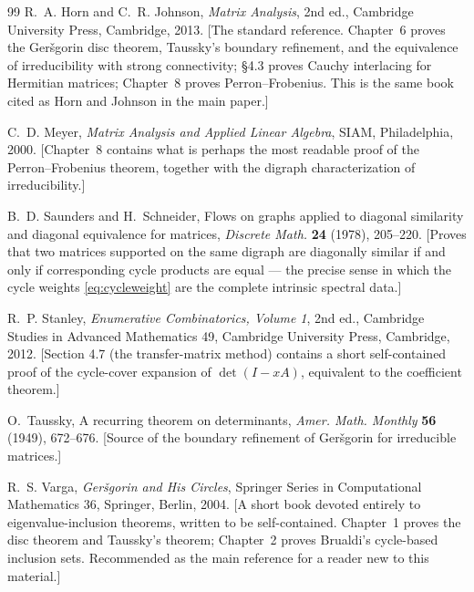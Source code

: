 \documentclass[11pt, fleqn]{amsart}
\theoremstyle{remark}
\begin{document}
\begin{thebibliography}{99}
R.~A. Horn and C.~R. Johnson,
\emph{Matrix Analysis},
2nd ed., Cambridge University Press, Cambridge, 2013.
[The standard reference. Chapter~6 proves the Ger\v{s}gorin disc
theorem, Taussky's boundary refinement, and the equivalence of
irreducibility with strong connectivity; \S 4.3 proves Cauchy
interlacing for Hermitian matrices; Chapter~8 proves Perron--Frobenius.
This is the same book cited as Horn and Johnson in the main paper.]

C.~D. Meyer,
\emph{Matrix Analysis and Applied Linear Algebra},
SIAM, Philadelphia, 2000.
[Chapter~8 contains what is perhaps the most readable proof of the
Perron--Frobenius theorem, together with the digraph characterization
of irreducibility.]

B.~D. Saunders and H.~Schneider,
Flows on graphs applied to diagonal similarity and diagonal equivalence
for matrices,
\emph{Discrete Math.} \textbf{24} (1978), 205--220.
[Proves that two matrices supported on the same digraph are diagonally
similar if and only if corresponding cycle products are equal --- the
precise sense in which the cycle weights \eqref{eq:cycleweight} are the
complete intrinsic spectral data.]

R.~P. Stanley,
\emph{Enumerative Combinatorics, Volume 1},
2nd ed., Cambridge Studies in Advanced Mathematics 49,
Cambridge University Press, Cambridge, 2012.
[Section 4.7 (the transfer-matrix method) contains a short
self-contained proof of the cycle-cover expansion of $\det(I - xA)$,
equivalent to the coefficient theorem.]

O.~Taussky,
A recurring theorem on determinants,
\emph{Amer. Math. Monthly} \textbf{56} (1949), 672--676.
[Source of the boundary refinement of Ger\v{s}gorin for irreducible
matrices.]

R.~S. Varga,
\emph{Ger\v{s}gorin and His Circles},
Springer Series in Computational Mathematics 36, Springer, Berlin, 2004.
[A short book devoted entirely to eigenvalue-inclusion theorems,
written to be self-contained. Chapter~1 proves the disc theorem and
Taussky's theorem; Chapter~2 proves Brualdi's cycle-based inclusion
sets. Recommended as the main reference for a reader new to this
material.]

\end{thebibliography}
\end{document}
